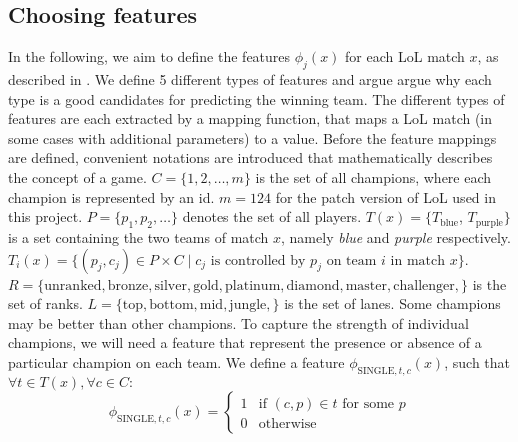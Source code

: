\subsection{Choosing features}\label{sec:choosingfeatures}
In the following, we aim to define the features $\phi_j(x)$ for each LoL match $x$, as described in .
We define 5 different types of features and argue argue why each type is a good candidates for predicting the winning team.
The different types of features are each extracted by a mapping function, that maps a LoL match (in some cases with additional parameters) to a value. 
Before the feature mappings are defined, convenient notations are introduced that mathematically describes the concept of a game.
$C = \{1, 2, \dots, m\}$ is the set of all champions, where each champion is represented by an id. $m = 124$ for the patch version of LoL used in this project.
$P = \{p_1, p_2, \dots\}$ denotes the set of all players.
$T(x) = \{T_\text{blue}$, $T_\text{purple}\}$ is a set containing the two teams of match $x$, namely \emph{blue} and \emph{purple} respectively.
$T_i(x) = \{ (p_j, c_j) \in P \times C \mid c_j \text{ is controlled by } p_j \text{ on team } i  \text{ in match } x \}$.
$R = \{\text{unranked},\text{bronze},\text{silver},\text{gold},\text{platinum},\text{diamond},\text{master},\text{challenger},\}$ is the set of ranks.
$L = \{\text{top},\text{bottom},\text{mid},\text{jungle},\}$ is the set of lanes.
Some champions may be better than other champions. To capture the strength of individual champions, we will need a feature that represent the presence or absence of a particular champion on each team.
We define a feature $\phi_{\text{SINGLE}, t, c}(x)$, such that $\forall t \in T(x), \forall c \in C:$
\begin{equation}\label{eq:single}  
\phi_{\text{SINGLE}, t, c}(x) = 
\begin{cases} 
  1 & \text{if } (c, p) \in t \text{ for some } p \\
  0 & \text{otherwise} 
\end{cases}
\end{equation}



